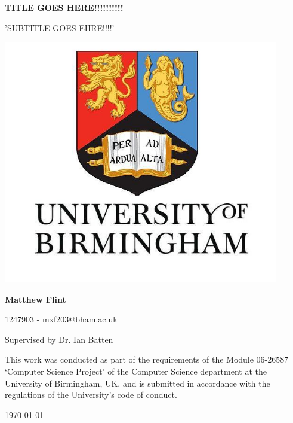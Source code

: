 \documentclass{article}
\begin{document}
    \begin{center}
        \LARGE
        \textbf{TITLE GOES HERE!!!!!!!!!!}
        
        \vspace{0.2cm}
        \large
        'SUBTITLE GOES EHRE!!!!'
        
        \vspace{1cm}
        \includegraphics[width=0.9\textwidth]{university}

        \vfill
        
        \large
        \textbf{Matthew Flint}
        
        \vspace{0.3cm}
        \normalsize
        1247903 - mxf203@bham.ac.uk
        
        \vspace{0.3cm}
        \normalsize
        Supervised by Dr. Ian Batten
        
        \vspace{0.5cm}
		This work was conducted as part of the requirements of the Module 06-26587 `Computer Science Project' of the Computer Science department at the University of Birmingham, UK, and is submitted in accordance with the regulations of the University's code of conduct.
		
		\vspace{0.2cm}
		\today
		
    \end{center}
    \newpage
\end{document}
